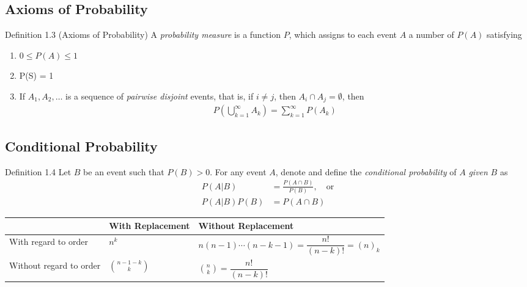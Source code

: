 \subsection{Axioms of Probability}
\begin{boks}{Definition 1.3 (Axioms of Probability)}
  A \textit{probability measure} is a function $P$, which assigns to each event $A$ a number of $P(A)$ satisfying
  \begin{enumerate}[label = \textbf{(\alph*)}]
    \item $0 \leq P(A) \leq 1$
    \item P(S) = 1
    \item If $A_1, A_2, \ldots$ is a sequence of \textit{pairwise disjoint} events, that is, if $i \neq j$, then $A_i \cap A_j = \emptyset$, then
    \begin{align*}
      P\left( \bigcup_{k = 1}^\infty A_k \right) = \sum_{k = 1}^\infty P(A_k)
    \end{align*}
  \end{enumerate}
\end{boks}
\subsection{Conditional Probability}
\begin{boks}{Definition 1.4}
  Let $B$ be an event such that $P(B) > 0$. For any event $A$, denote and define the \textit{conditional probability} of $A$ \textit{given} $B$ as
  \begin{align*}
    P(A|B) &= \frac{P(A \cap B)}{P(B)}, \quad \text{or}\\
    P(A|B)P(B) &= P(A \cap B)
  \end{align*}
\end{boks}

\begin{table}[h]
\centering
\begin{tabular}{l|ll}
 & With Replacement & Without Replacement \\ \hline
With regard to order & \multicolumn{1}{l|}{$n^k$} & \multicolumn{1}{l|}{$n(n - 1)\cdots(n - k - 1) = \dfrac{n!}{(n - k)!} = (n)_k$} \\ \cline{2-3}
Without regard to order & \multicolumn{1}{l|}{$\binom{n - 1 - k}{k}$} & \multicolumn{1}{l|}{$\binom{n}{k} = \dfrac{n!}{(n - k)!}$} \\ \cline{2-3}
\end{tabular}
\end{table}

